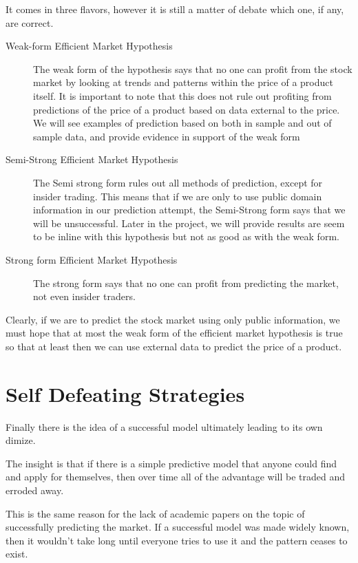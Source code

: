 \documentclass{report}
\begin{document}
It comes in three flavors, however it is still a matter of debate which one, if any, are correct.

\begin{description}
  \item[Weak-form Efficient Market Hypothesis] 
  The weak form of the hypothesis says that no one can profit from the stock market by looking at trends and patterns within the price of a product itself. It is important to note that this does not rule out profiting from predictions of the price of a product based on data external to the price. We will see examples of prediction based on both in sample and out of sample data, and provide evidence in support of the weak form
  
  \item[Semi-Strong Efficient Market Hypothesis]
  The Semi strong form rules out all methods of prediction, except for insider trading. This means that if we are only to use public domain information in our prediction attempt, the Semi-Strong form says that we will be unsuccessful. Later in the project, we will provide results are seem to be inline with this hypothesis but not as good as with the weak form.
  
  \item[Strong form Efficient Market Hypothesis]
  The strong form says that no one can profit from predicting the market, not even insider traders.
\end{description}


Clearly, if we are to predict the stock market using only public information, we must hope that at most the weak form of the efficient market hypothesis is true so that at least then we can use external data to predict the price of a product.

\section{Self Defeating Strategies}

Finally there is the idea of a successful model ultimately leading to its own dimize. 

The insight is that if there is a simple predictive model that anyone could find and apply for themselves, then over time all of the advantage will be traded and erroded away.

This is the same reason for the lack of academic papers on the topic of successfully predicting the market. If a successful model was made widely known, then it wouldn't take long until everyone tries to use it and the pattern ceases to exist.
\end{document}
